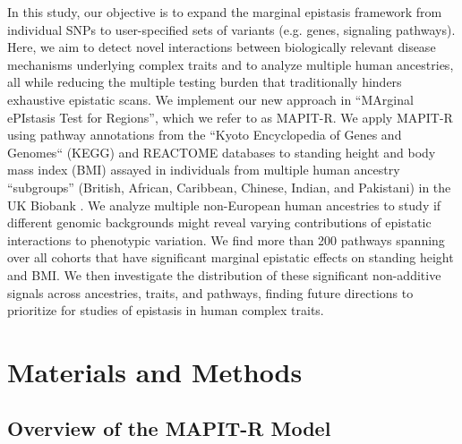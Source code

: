\documentclass[10pt]{article}
\begin{document}
In this study, our objective is to expand the marginal epistasis framework from individual SNPs to user-specified sets of variants (e.g. genes, signaling pathways). Here, we aim to detect novel interactions between biologically relevant disease mechanisms underlying complex traits and to analyze multiple human ancestries, all while reducing the multiple testing burden that traditionally hinders exhaustive epistatic scans. We implement our new approach in ``MArginal ePIstasis Test for Regions'', which we refer to as MAPIT-R. We apply MAPIT-R using pathway annotations from the ``Kyoto Encyclopedia of Genes and Genomes`` (KEGG) and REACTOME databases \cite{Liberzon2011} to standing height and body mass index (BMI) assayed in individuals from multiple human ancestry ``subgroups'' (British, African, Caribbean, Chinese, Indian, and Pakistani) in the UK Biobank \cite{Sudlow2015}. We analyze multiple non-European human ancestries to study if different genomic backgrounds might reveal varying contributions of epistatic interactions to phenotypic variation. We find more than 200 pathways spanning over all cohorts that have significant marginal epistatic effects on standing height and BMI. We then investigate the distribution of these significant non-additive signals across ancestries, traits, and pathways, finding future directions to prioritize for studies of epistasis in human complex traits.


\section*{Materials and Methods} 

\subsection*{Overview of the MAPIT-R Model}
\end{document}
